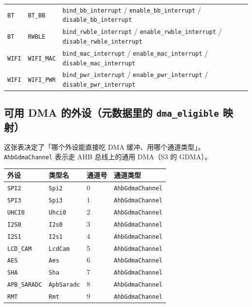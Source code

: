 \documentclass[UTF8,a4paper,11pt,fontset=fandol]{ctexart}
\newcommand{\fld}[1]{\texttt{#1}}
\newcommand{\tblhead}[1]{\textbf{#1}}
\begin{document}
\begin{center}
\begin{longtable}{@{}p{2.2cm}p{2.85cm}>{\raggedright\arraybackslash}p{7.55cm}@{}}
\fld{BT} & \fld{BT\_BB} & \fld{bind\_bb\_interrupt} / \fld{enable\_bb\_interrupt} / \fld{disable\_bb\_interrupt} \\
\fld{BT} & \fld{RWBLE} & \fld{bind\_rwble\_interrupt} / \fld{enable\_rwble\_interrupt} / \fld{disable\_rwble\_interrupt} \\
\fld{WIFI} & \fld{WIFI\_MAC} & \fld{bind\_mac\_interrupt} / \fld{enable\_mac\_interrupt} / \fld{disable\_mac\_interrupt} \\
\fld{WIFI} & \fld{WIFI\_PWR} & \fld{bind\_pwr\_interrupt} / \fld{enable\_pwr\_interrupt} / \fld{disable\_pwr\_interrupt} \\
\end{longtable}
\end{center}

\subsection{可用 DMA 的外设（元数据里的 \texttt{dma\_eligible} 映射）}

这张表决定了「哪个外设能直接吃 DMA 缓冲、用哪个通道类型」。
\fld{AhbGdmaChannel} 表示走 AHB 总线上的通用 DMA（S3 的 GDMA）。

\begin{center}\small
\begin{tabular}{@{}llll@{}}
\toprule
\tblhead{外设} & \tblhead{类型名} & \tblhead{通道号} & \tblhead{通道类型} \\
\midrule
\fld{SPI2} & \fld{Spi2} & 0 & \fld{AhbGdmaChannel} \\
\fld{SPI3} & \fld{Spi3} & 1 & \fld{AhbGdmaChannel} \\
\fld{UHCI0} & \fld{Uhci0} & 2 & \fld{AhbGdmaChannel} \\
\fld{I2S0} & \fld{I2s0} & 3 & \fld{AhbGdmaChannel} \\
\fld{I2S1} & \fld{I2s1} & 4 & \fld{AhbGdmaChannel} \\
\fld{LCD\_CAM} & \fld{LcdCam} & 5 & \fld{AhbGdmaChannel} \\
\fld{AES} & \fld{Aes} & 6 & \fld{AhbGdmaChannel} \\
\fld{SHA} & \fld{Sha} & 7 & \fld{AhbGdmaChannel} \\
\fld{APB\_SARADC} & \fld{ApbSaradc} & 8 & \fld{AhbGdmaChannel} \\
\fld{RMT} & \fld{Rmt} & 9 & \fld{AhbGdmaChannel} \\
\bottomrule
\end{tabular}
\end{center}
\end{document}
